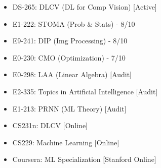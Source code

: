 
%
%
%
%



{}




\begin{itemize}
\item{DS-265: DLCV (DL for Comp Vision) [Active]}
\item{E1-222: STOMA (Prob \& Stats) - 8/10}
\item{E9-241: DIP (Img Processing) - 8/10}
\item{E0-230: CMO (Optimization) - 7/10}
\item{E0-298: LAA (Linear Algebra) [Audit]}
\item{E2-335: Topics in Artificial Intelligence [Audit]}
\item{E1-213: PRNN (ML Theory) [Audit]}
\item{CS231n: DLCV [Online]}
\item{CS229: Machine Learning [Online]}
\item{Coursera: ML Specialization [Stanford Online]}
\end{itemize}



